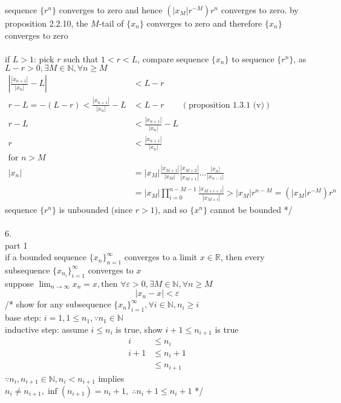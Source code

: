 \documentclass[12pt, border = 4pt, multi]{article} %
\begin{document}
sequence $\{r ^ n\}$ converges to zero and hence $(|x_M|r ^ {-M})r ^ n$ converges to zero. by proposition 2.2.10, the $M$-tail of $\{x_n\}$ converges to zero and therefore $\{x_n\}$ converges to zero\\
\\
if $L > 1$: pick $r$ such that $1 < r < L$, compare sequence $\{x_n\}$ to sequence $\{r ^ n\}$, as $L - r > 0, \exists M \in \mathbb{N}, \forall n \geq M$
\begin{align*}
\left|\frac{|x_{n + 1}|}{|x_n|} - L\right| &< L - r\\
r - L = -(L - r) < \frac{|x_{n + 1}|}{|x_n|} - L &< L - r \qquad (\text{proposition 1.3.1 (v)})\\
r - L &< \frac{|x_{n + 1}|}{|x_n|} - L\\
r &< \frac{|x_{n + 1}|}{|x_n|}\\
\text{for } n > M\\
|x_n| &= |x_M|\frac{|x_{M + 1}|}{|x_M|}\frac{|x_{M + 2}|}{|x_{M + 1}|}\dots\frac{|x_n|}{|x_{n - 1}|}\\
&= |x_M|\prod_{i = 0} ^ {n - M - 1} \frac{|x_{M + i + 1}|}{|x_{M + i}|} > |x_M|r ^ {n - M} = (|x_M|r ^ {-M})r ^ n
\end{align*}
sequence $\{r ^ n\}$ is unbounded (since $r > 1$), and so $\{x ^ n\}$ cannot be bounded */
\\
\\
6.\\
part 1\\
if a bounded sequence $\{x_n\}_{n = 1} ^ {\infty}$ converges to a limit $x \in \mathbb{R}$, then every subsequence $\{x_{n_i}\}_{i = 1} ^ {\infty}$ converges to $x$\\
suppose $\lim_{n \rightarrow \infty} x_n = x, \text{then } \forall \varepsilon > 0, \exists M \in \mathbb{N}, \forall n \geq M$
\[|x_n - x| < \varepsilon\]
/* show for any subsequence $\{x_n\}_{i = 1} ^ {\infty}, \forall i \in \mathbb{N}, n_i \geq i$\\
base step: $i = 1, 1 \leq n_1, \because n_1 \in \mathbb{N}$\\
inductive step: assume $i \leq n_i$ is true, show $i + 1 \leq n_{i + 1}$ is true
\begin{align*}
i &\leq n_i\\
i + 1 &\leq n_i + 1\\
&\leq n_{i + 1}
\end{align*}
$\because n_i, n_{i + 1} \in \mathbb{N}, n_i < n_{i + 1}$ implies $n_i \not= n_{i + 1}, \inf(n_{i + 1}) = n_i + 1, \;\therefore n_i + 1 \leq n_i + 1$ */\\
\end{document}

